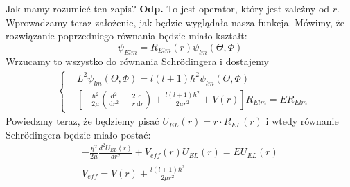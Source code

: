  Jak mamy rozumieć ten zapis? \textbf{Odp.} To jest operator, który jest zależny od $r$. Wprowadzamy teraz założenie, jak będzie wyglądała nasza funkcja. Mówimy, że rozwiązanie poprzedniego równania będzie miało kształt:
\begin{equation*}
	\psi_{Elm} = R_{Elm}(r) \psi_{lm}(\Theta, \Phi)
\end{equation*}
Wrzucamy to wszystko do równania Schrödingera i dostajemy
\begin{align*}
	&\left\{
	\begin{aligned}
		&L^2 \psi_{lm}(\Theta, \Phi) =  l(l+1) \hbar^2 \psi_{lm}(\Theta, \Phi)\\
		&\left[-\frac{\hbar^2}{2\mu} \left(\frac{\text{d}^2}{\text{d}r^2} + \frac2r \frac{\text{d}}{\text{d}r} \right) + \frac{l(l+1)\hbar^2}{2 \mu r^2} + V(r)\right] R_{Elm} = E R_{Elm}
	\end{aligned}
	\right.
\end{align*}
Powiedzmy teraz, że będziemy pisać $U_{EL}(r) = r \cdot R_{EL}(r)$ i wtedy równanie Schrödingera będzie miało postać:
\begin{equation*}
	\begin{gathered}
		-\frac{\hbar^2}{2\mu}\frac{d^2 U_{EL}(r)}{dr^2}+V_{eff}(r)U_{EL}(r)=EU_{EL}(r) \\
		V_{eff} = V(r)+\frac{l(l+1)\hbar^2}{2\mu r^2}
	\end{gathered}
\end{equation*}
